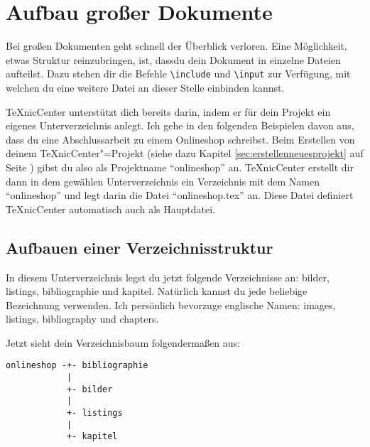 %
%

\chapter{Aufbau großer Dokumente}
\label{sec:aufbaugrosserdokumente}

Bei großen Dokumenten geht schnell der Überblick verloren. Eine Möglichkeit, etwas Struktur reinzubringen, ist, dassdu dein Dokument in einzelne Dateien aufteilst. Dazu stehen dir die Befehle \texttt{\textbackslash include} und \texttt{\textbackslash input} zur Verfügung, mit welchen du eine weitere Datei an dieser Stelle einbinden kannst.

TeXnicCenter unterstützt dich bereits darin, indem er für dein Projekt ein eigenes Unterverzeichnis anlegt. Ich gehe in den folgenden Beispielen davon aus, dass du eine Abschlussarbeit zu einem Onlineshop schreibst. Beim Erstellen von deinem TeXnicCenter"=Projekt (siehe dazu Kapitel \ref{sec:erstellenneuesprojekt} auf Seite \pageref{sec:erstellenneuesprojekt}) gibst du also als Projektname \enquote{onlineshop} an. TeXnicCenter erstellt dir dann in dem gewählen Unterverzeichnis ein Verzeichnis mit dem Namen \enquote{onlineshop} und legt darin die Datei \enquote{onlineshop.tex} an. Diese Datei definiert TeXnicCenter automatisch auch als Hauptdatei.

\section{Aufbauen einer Verzeichnisstruktur}

In diesem Unterverzeichnis legst du jetzt folgende Verzeichnisse an: bilder, listings, bibliographie und kapitel. Natürlich kannst du jede beliebige Bezeichnung verwenden. Ich persönlich bevorzuge englische Namen: images, listings, bibliography und chapters. 

Jetzt sieht dein Verzeichnisbaum folgendermaßen aus:

\begin{verbatim}
onlineshop -+- bibliographie
            |
            +- bilder
            |
            +- listings
            |
            +- kapitel
\end{verbatim}

